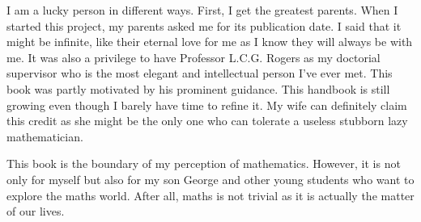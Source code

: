 I am a lucky person in different ways. First, I get the greatest parents. When I started this project, my parents asked me for its publication date. I said that it might be infinite, like their eternal love for me as I know they will always be with me. It was also a privilege to have Professor L.C.G. Rogers as my doctorial supervisor who is the most elegant and intellectual person I've ever met. This book was partly motivated by his prominent guidance. This handbook is still growing even though I barely have time to refine it. My wife can definitely claim this credit as she might be the only one who can tolerate a useless stubborn lazy mathematician.

This book is the boundary of my perception of mathematics. However, it is not only for myself but also for my son George and other young students who want to explore the maths world. After all, maths is not trivial as it is actually the matter of our lives.

$\qquad$


